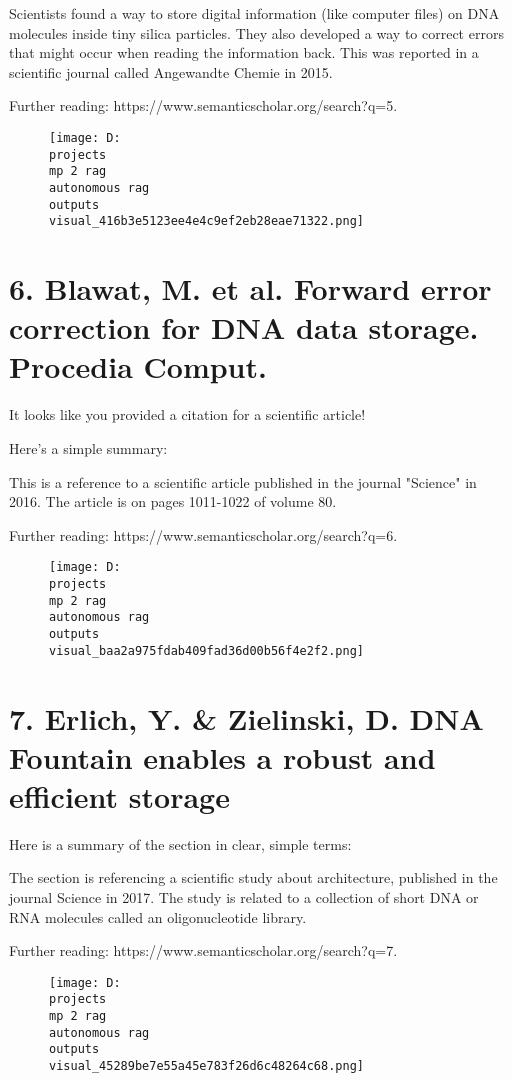 \documentclass[12pt,a4paper]{article}
\begin{document}
Scientists found a way to store digital information (like computer files) on DNA molecules inside tiny silica particles. They also developed a way to correct errors that might occur when reading the information back. This was reported in a scientific journal called Angewandte Chemie in 2015.

Further reading: https://www.semanticscholar.org/search?q=5.	%
\begin{figure}[h]
\centering
\texttt{[image: D:\\projects\\mp 2 rag\\autonomous rag\\outputs\\visual\_416b3e5123ee4e4c9ef2eb28eae71322.png]}
\end{figure}
\section{6.	 Blawat, M. et al. Forward error correction for DNA data storage. Procedia Comput.}
It looks like you provided a citation for a scientific article!

Here's a simple summary:

This is a reference to a scientific article published in the journal "Science" in 2016. The article is on pages 1011-1022 of volume 80.

Further reading: https://www.semanticscholar.org/search?q=6.	%
\begin{figure}[h]
\centering
\texttt{[image: D:\\projects\\mp 2 rag\\autonomous rag\\outputs\\visual\_baa2a975fdab409fad36d00b56f4e2f2.png]}
\end{figure}
\section{7.	 Erlich, Y. & Zielinski, D. DNA Fountain enables a robust and efficient storage}
Here is a summary of the section in clear, simple terms:

The section is referencing a scientific study about architecture, published in the journal Science in 2017. The study is related to a collection of short DNA or RNA molecules called an oligonucleotide library.

Further reading: https://www.semanticscholar.org/search?q=7.	%
\begin{figure}[h]
\centering
\texttt{[image: D:\\projects\\mp 2 rag\\autonomous rag\\outputs\\visual\_45289be7e55a45e783f26d6c48264c68.png]}
\end{figure}
\end{document}

